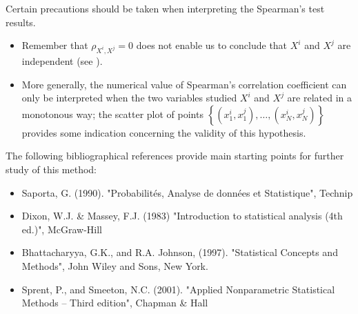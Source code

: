 {
  Certain precautions should be taken when interpreting the Spearman's test results.
  \begin{itemize}
  \item Remember that  $\rho_{X^i,X^j}= 0$ does not enable us to conclude that $X^i$ and $X^j$ are independent (see ).
  \item More generally, the numerical value of Spearman's correlation coefficient can only be interpreted when the two variables studied $X^i$ and $X^j$ are related in a monotonous way; the scatter plot of points $\left\{ (x^i_1,x^j_1),\ldots,(x^i_N,x^j_N) \right\}$  provides some indication concerning the validity of this hypothesis.
  \end{itemize}

  The following bibliographical references provide main starting points for further study of this method:
  \begin{itemize}
  \item Saporta, G. (1990). "Probabilités, Analyse de données et Statistique", Technip
  \item Dixon, W.J. \& Massey, F.J. (1983) "Introduction to statistical analysis (4th ed.)", McGraw-Hill
  \item Bhattacharyya, G.K., and R.A. Johnson, (1997). "Statistical Concepts and Methods", John Wiley and Sons, New York.
  \item Sprent, P., and Smeeton, N.C. (2001). "Applied Nonparametric Statistical Methods -- Third edition", Chapman \& Hall
  \end{itemize}

}
